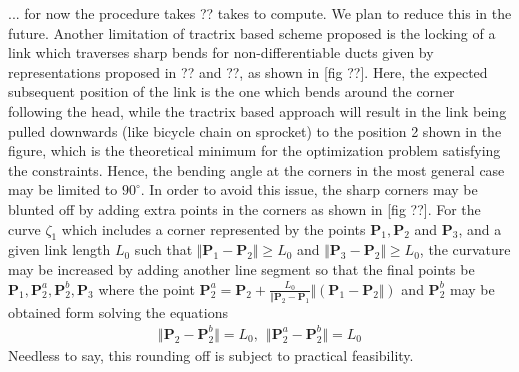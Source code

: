 \documentclass[12pt,a4]{article}
\begin{document}
... for now the procedure takes ?? takes to compute. We plan to reduce this in the future.
Another limitation of tractrix based scheme proposed is the locking of a link which traverses sharp bends for non-differentiable ducts given by representations proposed in ?? and ??, as shown in [fig ??]. Here, the expected subsequent position of the link is the one which bends around the corner following the head, while the tractrix based approach will result in the link being pulled downwards (like bicycle chain on sprocket) to the position 2 shown in the figure, which is the theoretical minimum for the optimization problem satisfying the constraints. Hence, the bending angle at the corners in the most general case may be limited to $90^\circ$. In order to avoid this issue, the sharp corners may be blunted off by adding extra points in the corners as shown in [fig ??]. For the curve $\zeta_1$ which includes a corner represented by the points $\mathbf{P}_1,\mathbf{P}_2$ and $\mathbf{P}_3$, and a given link length $L_0$ such that $\Vert \mathbf{P}_1-\mathbf{P}_2\Vert\geq L_0$  and $\Vert \mathbf{P}_3-\mathbf{P}_2\Vert\geq L_0$, the curvature may be increased by adding another line segment so that the final points be $\mathbf{P}_1,\mathbf{P}_2^a,\mathbf{P}_2^b,\mathbf{P}_3$  where the point $\mathbf{P}_2^a=\mathbf{P}_2+\frac{L_0}{\Vert \mathbf{P}_2-\mathbf{P}_1}\Vert\left(\mathbf{P}_1-\mathbf{P}_2\Vert\right)$ and $\mathbf{P}_2^b$ may be obtained form solving the equations
\begin{align}
\Vert \mathbf{P}_2-\mathbf{P}_2^b\Vert = L_0,~~\Vert \mathbf{P}_2^a-\mathbf{P}_2^b\Vert = L_0
\end{align} 
Needless to say, this rounding off is subject to practical feasibility.
\end{document}
